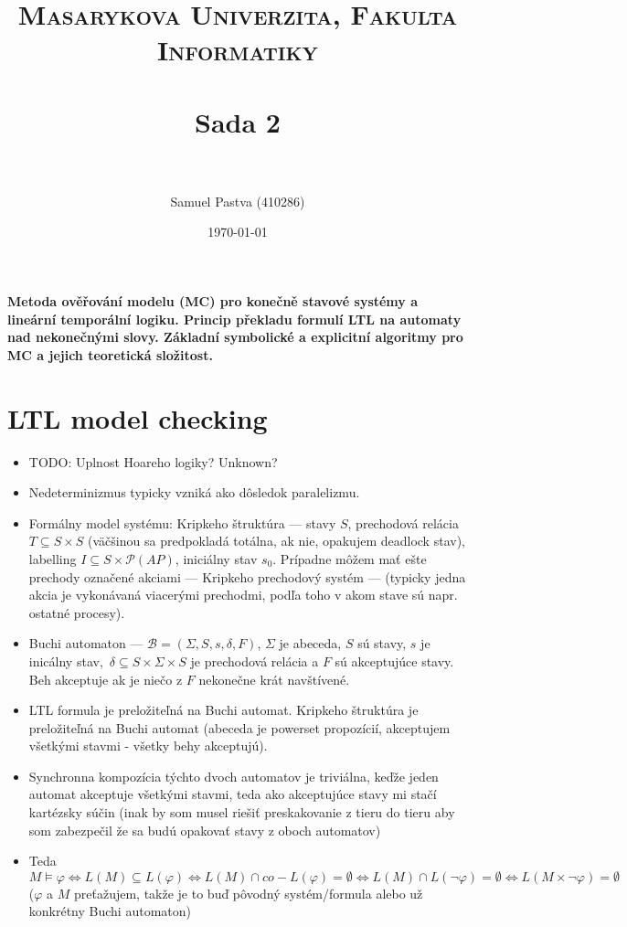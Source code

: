\documentclass[paper=a4, fontsize=11pt]{scrartcl} %
\title{	
	\normalfont \normalsize 
	\textsc{Masarykova Univerzita, Fakulta Informatiky} \\ [25pt] %
	\horrule{0.5pt} \\[0.4cm] %
	\huge Sada 2 \\ %
	\horrule{2pt} \\[0.5cm] %
}
\author{Samuel Pastva (410286)} %
\date{\normalsize\today} %
\numberwithin{equation}{section} %
\numberwithin{figure}{section} %
\numberwithin{table}{section} %
\begin{document}
	
	\textbf{Metoda ověřování modelu (MC) pro konečně stavové systémy a lineární temporální logiku. Princip překladu formulí LTL na automaty nad nekonečnými slovy.  Základní symbolické a explicitní algoritmy pro MC a jejich teoretická složitost. }
	
	\section{LTL model checking}
	
	\begin{itemize}
		\item TODO: Uplnost Hoareho logiky? Unknown?
		
		\item Nedeterminizmus typicky vzniká ako dôsledok paralelizmu.
		
		\item Formálny model systému: Kripkeho štruktúra — stavy $S$, prechodová relácia $T \subseteq S \times S$ (väčšinou sa predpokladá totálna, ak nie, opakujem deadlock stav), labelling $I \subseteq S \times \mathcal{P}(AP)$, iniciálny stav $s_0$. Prípadne môžem mať ešte prechody označené akciami — Kripkeho prechodový systém — (typicky jedna akcia je vykonávaná viacerými prechodmi, podľa toho v akom stave sú napr. ostatné procesy). 
		
		\item Buchi automaton — $\mathcal{B} = (\Sigma, S, s, \delta, F)$, $\Sigma$ je abeceda, $S$ sú stavy, $s$ je inicálny stav, $\delta \subseteq S \times \Sigma \times S$ je prechodová relácia a $F$ sú akceptujúce stavy. Beh akceptuje ak je niečo z $F$ nekonečne krát navštívené. 
		
		\item LTL formula je preložiteľná na Buchi automat. Kripkeho štruktúra je preložiteľná na Buchi automat (abeceda je powerset propozícií, akceptujem všetkými stavmi - všetky behy akceptujú).
		
		\item Synchronna kompozícia týchto dvoch automatov je triviálna, keďže jeden automat akceptuje všetkými stavmi, teda ako akceptujúce stavy mi stačí kartézsky súčin (inak by som musel riešiť preskakovanie z tieru do tieru aby som zabezpečil že sa budú opakovať stavy z oboch automatov)
		
		\item Teda $M \models \varphi \iff L(M) \subseteq L(\varphi) \iff L(M) \cap co-L(\varphi) = \emptyset \iff L(M) \cap L(\neg\varphi) = \emptyset \iff L(M \times \neg\varphi) = \emptyset$ ($\varphi$ a $M$ preťažujem, takže je to buď pôvodný systém/formula alebo už konkrétny Buchi automaton)
		

\end{itemize}
\end{document}
